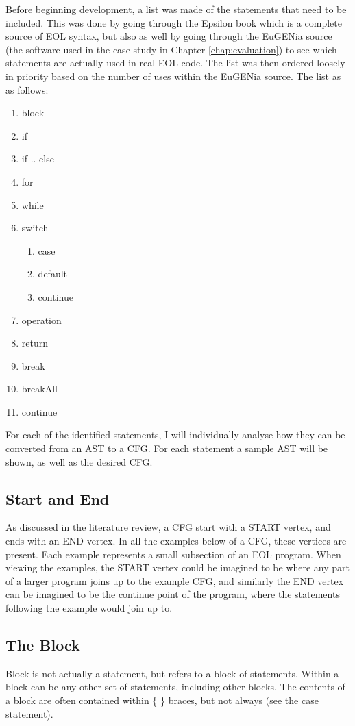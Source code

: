 Before beginning development, a list was made of the statements that need to be included. This was done by going through the Epsilon book \citep{epsilonBook} which is a complete source of EOL syntax, but also as well by going through the EuGENia source (the software used in the case study in Chapter \ref{chap:evaluation}) to see which statements are actually used in real EOL code. The list was then ordered loosely in priority based on the number of uses within the EuGENia source. The list as as follows:

\begin{enumerate}[nolistsep]
\item block
\item if
\item if .. else
\item for
\item while
\item switch
	\begin{enumerate}
	\item case
	\item default
	\item continue
	\end{enumerate}
\item operation
\item return
\item break
\item breakAll
\item continue
\end{enumerate}

For each of the identified statements, I will individually analyse how they can be converted from an AST to a CFG. For each statement a sample AST will be shown, as well as the desired CFG.

\subsection{Start and End}
As discussed in the literature review, a CFG start with a START vertex, and ends with an END vertex. In all the examples below of a CFG, these vertices are present. Each example represents a small subsection of an EOL program. When viewing the examples, the START vertex could be imagined to be where any part of a larger program joins up to the example CFG, and similarly the END vertex can be imagined to be the continue point of the program, where the statements following the example would join up to.

\subsection{The Block}
Block is not actually a statement, but refers to a block of statements. Within a block can be any other set of statements, including other blocks. The contents of a block are often contained within \{ \} braces, but not always (see the case statement).

